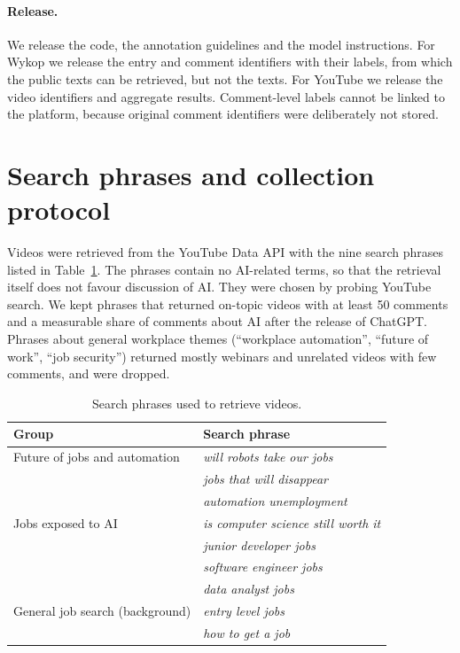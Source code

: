 \documentclass[11pt]{article}
\begin{document}
\paragraph{Release.} %
We release the code, the annotation guidelines and the model instructions.
For Wykop we release the entry and comment identifiers with their labels,
from which the public texts can be retrieved, but not the texts. For YouTube
we release the video identifiers and aggregate results. Comment-level labels
cannot be linked to the platform, because original comment identifiers were
deliberately not stored.
%



\appendix

\section{Search phrases and collection protocol}
\label{app:queries}

Videos were retrieved from the YouTube Data API with the nine search phrases
listed in Table~\ref{tab:queries}. The phrases contain no AI-related terms, so
that the retrieval itself does not favour discussion of AI. They were chosen by
probing YouTube search. We kept phrases that returned on-topic
videos with at least 50 comments and a measurable share of comments about AI
after the release of ChatGPT. Phrases about general workplace themes (``workplace
automation'', ``future of work'', ``job security'') returned mostly webinars and
unrelated videos with few comments, and were dropped.

\begin{table}[h]
\centering
\small
\begin{tabular}{ll}
\toprule
Group & Search phrase \\
\midrule
Future of jobs and automation & \textit{will robots take our jobs} \\
                              & \textit{jobs that will disappear} \\
                              & \textit{automation unemployment} \\
Jobs exposed to AI            & \textit{is computer science still worth it} \\
                              & \textit{junior developer jobs} \\
                              & \textit{software engineer jobs} \\
                              & \textit{data analyst jobs} \\
General job search (background) & \textit{entry level jobs} \\
                                & \textit{how to get a job} \\
\bottomrule
\end{tabular}
\caption{Search phrases used to retrieve videos.}
\label{tab:queries}
\end{table}
\end{document}
